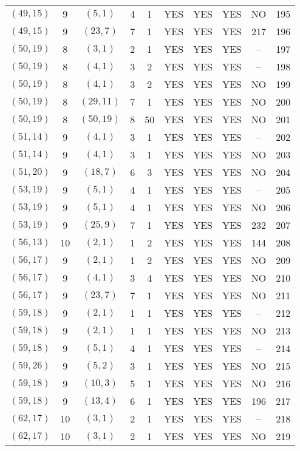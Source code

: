 \begin{longtable}{|c|c|c|c|c|c|c|c|c|c|}
$(49, 15)$ & 9 & $(5, 1)$ & 4 & 1 & YES & YES & YES & NO & 195\\
$(49, 15)$ & 9 & $(23, 7)$ & 7 & 1 & YES & YES & YES & 217 & 196\\
$(50, 19)$ & 8 & $(3, 1)$ & 2 & 1 & YES & YES & YES & -- & 197\\
$(50, 19)$ & 8 & $(4, 1)$ & 3 & 2 & YES & YES & YES & -- & 198\\
$(50, 19)$ & 8 & $(4, 1)$ & 3 & 2 & YES & YES & YES & NO & 199\\
$(50, 19)$ & 8 & $(29, 11)$ & 7 & 1 & YES & YES & YES & NO & 200\\
$(50, 19)$ & 8 & $(50, 19)$ & 8 & 50 & YES & YES & YES & NO & 201\\
$(51, 14)$ & 9 & $(4, 1)$ & 3 & 1 & YES & YES & YES & -- & 202\\
$(51, 14)$ & 9 & $(4, 1)$ & 3 & 1 & YES & YES & YES & NO & 203\\
$(51, 20)$ & 9 & $(18, 7)$ & 6 & 3 & YES & YES & YES & NO & 204\\
$(53, 19)$ & 9 & $(5, 1)$ & 4 & 1 & YES & YES & YES & -- & 205\\
$(53, 19)$ & 9 & $(5, 1)$ & 4 & 1 & YES & YES & YES & NO & 206\\
$(53, 19)$ & 9 & $(25, 9)$ & 7 & 1 & YES & YES & YES & 232 & 207\\
$(56, 13)$ & 10 & $(2, 1)$ & 1 & 2 & YES & YES & YES & 144 & 208\\
$(56, 17)$ & 9 & $(2, 1)$ & 1 & 2 & YES & YES & YES & NO & 209\\
$(56, 17)$ & 9 & $(4, 1)$ & 3 & 4 & YES & YES & YES & NO & 210\\
$(56, 17)$ & 9 & $(23, 7)$ & 7 & 1 & YES & YES & YES & NO & 211\\
$(59, 18)$ & 9 & $(2, 1)$ & 1 & 1 & YES & YES & YES & -- & 212\\
$(59, 18)$ & 9 & $(2, 1)$ & 1 & 1 & YES & YES & YES & NO & 213\\
$(59, 18)$ & 9 & $(5, 1)$ & 4 & 1 & YES & YES & YES & -- & 214\\
$(59, 26)$ & 9 & $(5, 2)$ & 3 & 1 & YES & YES & YES & NO & 215\\
$(59, 18)$ & 9 & $(10, 3)$ & 5 & 1 & YES & YES & YES & NO & 216\\
$(59, 18)$ & 9 & $(13, 4)$ & 6 & 1 & YES & YES & YES & 196 & 217\\
$(62, 17)$ & 10 & $(3, 1)$ & 2 & 1 & YES & YES & YES & -- & 218\\
$(62, 17)$ & 10 & $(3, 1)$ & 2 & 1 & YES & YES & YES & NO & 219\\

\end{longtable}
